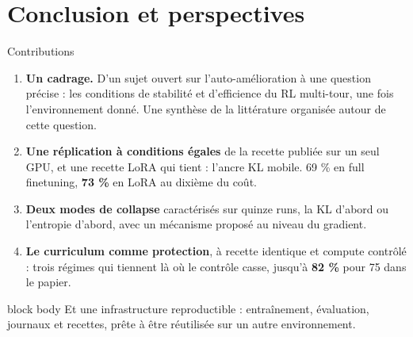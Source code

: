 \documentclass[aspectratio=169,10pt]{beamer}
\newcommand{\hl}[1]{\textcolor{crOrange}{\textbf{#1}}}
\newenvironment{keymsg}{\begin{beamercolorbox}[sep=6pt,wd=\textwidth]{block body}\small}{\end{beamercolorbox}}
\begin{document}
\section{Conclusion et perspectives}

\begin{frame}{Contributions}
\begin{enumerate}
  \item \textbf{Un cadrage.} D'un sujet ouvert sur l'auto-amélioration à une question précise : les conditions de stabilité et d'efficience du RL multi-tour, une fois l'environnement donné. Une synthèse de la littérature organisée autour de cette question.
  \item \textbf{Une réplication à conditions égales} de la recette publiée sur un seul GPU, et une recette LoRA qui tient : l'ancre KL mobile. 69 \% en full finetuning, \hl{73 \%} en LoRA au dixième du coût.
  \item \textbf{Deux modes de collapse} caractérisés sur quinze runs, la KL d'abord ou l'entropie d'abord, avec un mécanisme proposé au niveau du gradient.
  \item \textbf{Le curriculum comme protection}, à recette identique et compute contrôlé : trois régimes qui tiennent là où le contrôle casse, jusqu'à \hl{82 \%} pour 75 dans le papier.
\end{enumerate}
\vspace{0.2cm}
\begin{keymsg}
Et une infrastructure reproductible : entraînement, évaluation, journaux et recettes, prête à être réutilisée sur un autre environnement.
\end{keymsg}
\end{frame}
\end{document}
